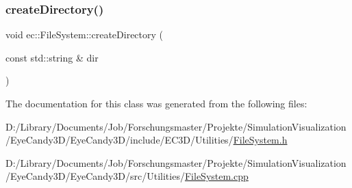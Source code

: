 \subsubsection{\texorpdfstring{create\+Directory()}{createDirectory()}}
{\footnotesize\ttfamily void ec\+::\+File\+System\+::create\+Directory (\begin{DoxyParamCaption}\item[{const std\+::string \&}]{dir }\end{DoxyParamCaption})\hspace{0.3cm}{\ttfamily [static]}}



The documentation for this class was generated from the following files\+:\begin{DoxyCompactItemize}
\item 
D\+:/\+Library/\+Documents/\+Job/\+Forschungsmaster/\+Projekte/\+Simulation\+Visualization/\+Eye\+Candy3\+D/\+Eye\+Candy3\+D/include/\+E\+C3\+D/\+Utilities/\mbox{\hyperlink{_file_system_8h}{File\+System.\+h}}\item 
D\+:/\+Library/\+Documents/\+Job/\+Forschungsmaster/\+Projekte/\+Simulation\+Visualization/\+Eye\+Candy3\+D/\+Eye\+Candy3\+D/src/\+Utilities/\mbox{\hyperlink{_file_system_8cpp}{File\+System.\+cpp}}\end{DoxyCompactItemize}
